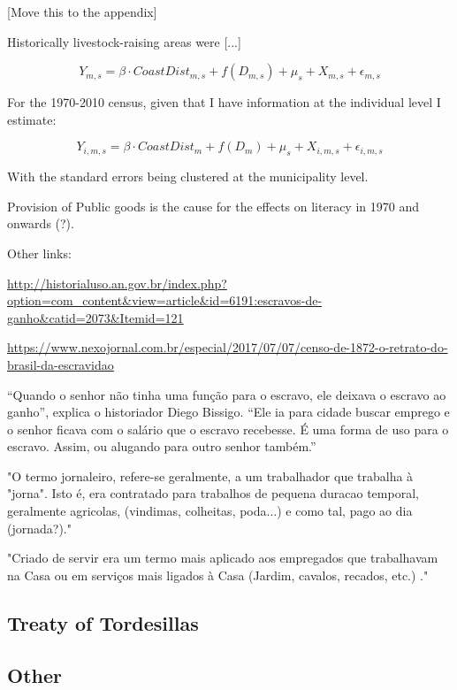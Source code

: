 \documentclass{article}
\begin{document}
[Move this to the appendix]

Historically livestock-raising areas were [...]

\begin{equation}
  Y_{m,s} = \beta \cdot CoastDist_{m,s} + f(D_{m,s})+ \mu_s + X_{m,s} + \epsilon_{m,s}
\end{equation}

For the 1970-2010 census, given that I have information at the individual level I estimate:

\begin{equation}
  Y_{i,m,s} = \beta \cdot CoastDist_{m} + f(D_{m})+ \mu_s + X_{i,m,s} + \epsilon_{i,m,s}
\end{equation}

With the standard errors being clustered at the municipality level. 


Provision of Public goods is the cause for the effects on literacy in 1970 and onwards (?).

Other links:

\url{http://historialuso.an.gov.br/index.php?option=com_content&view=article&id=6191:escravos-de-ganho&catid=2073&Itemid=121}

\url{https://www.nexojornal.com.br/especial/2017/07/07/censo-de-1872-o-retrato-do-brasil-da-escravidao}

“Quando o senhor não tinha uma função para o escravo, ele deixava o escravo ao ganho”, explica o historiador Diego Bissigo. “Ele ia para cidade buscar emprego e o senhor ficava com o salário que o escravo recebesse. É uma forma de uso para o escravo. Assim, ou alugando para outro senhor também.”

"O termo jornaleiro, refere-se geralmente, a um trabalhador que trabalha à "jorna". Isto é, era contratado para trabalhos de pequena duracao temporal, geralmente agricolas, (vindimas, colheitas, poda...) e como tal, pago ao dia (jornada?)."

"Criado de servir era um termo mais aplicado aos empregados que trabalhavam na Casa ou em serviços mais ligados à Casa (Jardim, cavalos, recados, etc.) ."

\parencite[p.~142]{De_Oliveira_Andrade1980-xz}

\subsection{Treaty of Tordesillas}

\subsection{Other}
\end{document}
